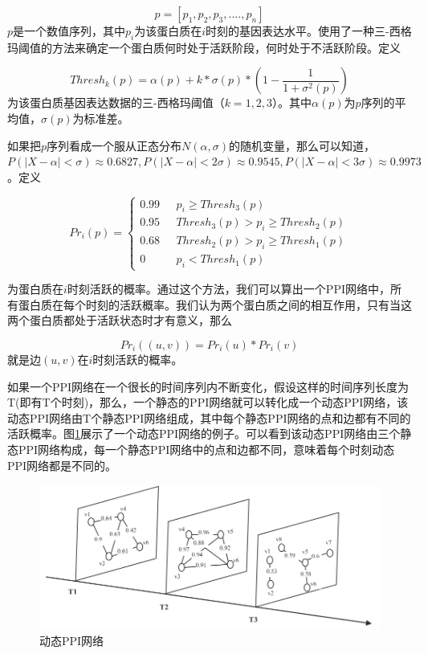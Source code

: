 \begin{equation}\label{dppi1}
p=[ p_1,p_2,p_3,....,p_n]
\end{equation}
$p$是一个数值序列，其中$p_i$为该蛋白质在$i$时刻的基因表达水平。\cite{zhang2016method}使用了一种三-西格玛阈值的方法来确定一个蛋白质何时处于活跃阶段，何时处于不活跃阶段。定义

\begin{equation}\label{dppi2}
Thresh_k(p)=\alpha (p)+k*\sigma (p)*\left (1-\frac{1}{1+\sigma ^2(p)}\right )
\end{equation}
为该蛋白质基因表达数据的三-西格玛阈值（$k=1,2,3$）。其中$\alpha (p)$为$p$序列的平均值，$\sigma (p)$为标准差。

如果把$p$序列看成一个服从正态分布$N(\alpha,\sigma)$的随机变量，那么可以知道，$P(|X-\alpha|<\sigma)\approx 0.6827,P(|X-\alpha|<2\sigma)\approx 0.9545,P(|X-\alpha|<3\sigma)\approx 0.9973$。定义

\begin{equation}\label{dppi3}
Pr_i(p)= \begin{cases}
0.99 & \text{  } p_i\geq Thresh_3(p)\\ 
0.95 & \text{  } Thresh_3(p)> p_i\geq Thresh_2(p) \\ 
0.68 & \text{  } Thresh_2(p)> p_i\geq Thresh_1(p) \\ 
0 & \text{  } p_i<Thresh_1(p) 
\end{cases}
\end{equation}


为蛋白质在$i$时刻活跃的概率。通过这个方法，我们可以算出一个PPI网络中，所有蛋白质在每个时刻的活跃概率。我们认为两个蛋白质之间的相互作用，只有当这两个蛋白质都处于活跃状态时才有意义，那么

\begin{equation}\label{dppi4}
Pr_i((u,v))= Pr_i(u)*Pr_i(v)
\end{equation}
就是边$(u,v)$在$i$时刻活跃的概率。

如果一个PPI网络在一个很长的时间序列内不断变化，假设这样的时间序列长度为T(即有T个时刻)，那么，一个静态的PPI网络就可以转化成一个动态PPI网络，该动态PPI网络由T个静态PPI网络组成，其中每个静态PPI网络的点和边都有不同的活跃概率。图\ref{fig:dppi}展示了一个动态PPI网络的例子。可以看到该动态PPI网络由三个静态PPI网络构成，每一个静态PPI网络中的点和边都不同，意味着每个时刻动态PPI网络都是不同的。

\begin{figure}[htbp]
\centering
\includegraphics[height=0.25\textheight]{pic/dppi.png}
\captionsetup{margin=50pt}
\caption{动态PPI网络 \cite{zhang2016method} \label{fig:dppi}}
\end{figure}
